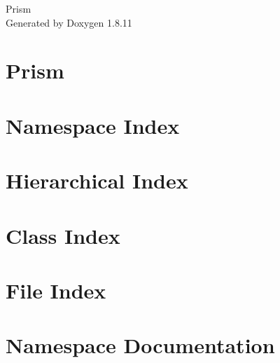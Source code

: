 \documentclass[twoside]{book}
\newcommand{\+}{\discretionary{\mbox{\scriptsize$\hookleftarrow$}}{}{}}
\newcommand{\clearemptydoublepage}{%
  \newpage{\pagestyle{empty}\cleardoublepage}%
}
\begin{document}
\hypersetup{pageanchor=false,
             bookmarksnumbered=true,
             pdfencoding=unicode
            }
\begin{titlepage}
\vspace*{7cm}
\begin{center}%
{\Large Prism }\\
\vspace*{1cm}
{\large Generated by Doxygen 1.8.11}\\
\end{center}
\end{titlepage}
\clearemptydoublepage
\tableofcontents
\clearemptydoublepage
{}
\hypersetup{pageanchor=true}

\chapter{Prism}
\label{md_README}
\hypertarget{md_README}{}

\chapter{Namespace Index}

\chapter{Hierarchical Index}

\chapter{Class Index}

\chapter{File Index}

\chapter{Namespace Documentation}


\end{document}

